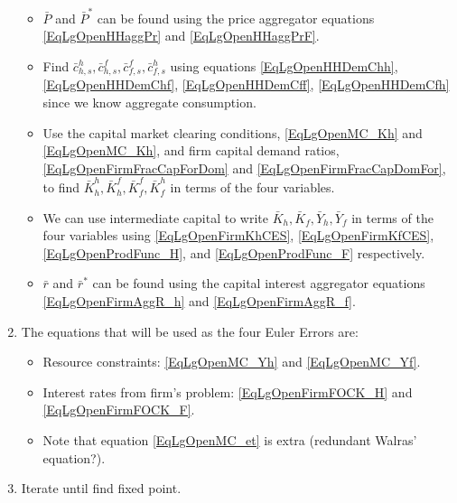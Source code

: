 \documentclass[letterpaper,12pt]{article}
\theoremstyle{definition}
\begin{document}
\begin{enumerate}
\begin{itemize}
        \item $\bar{P}$ and $\bar{P}^*$ can be found using the price aggregator equations \eqref{EqLgOpenHHaggPr} and \eqref{EqLgOpenHHaggPrF}.
        \item Find $\bar{c}_{h,s}^h, \bar{c}_{h,s}^f, \bar{c}_{f,s}^f, \bar{c}_{f,s}^h$ using equations \eqref{EqLgOpenHHDemChh}, \eqref{EqLgOpenHHDemChf}, \eqref{EqLgOpenHHDemCff}, \eqref{EqLgOpenHHDemCfh} since we know aggregate consumption.
        \item Use the capital market clearing conditions, \eqref{EqLgOpenMC_Kh} and \eqref{EqLgOpenMC_Kh}, and firm capital demand ratios,  \eqref{EqLgOpenFirmFracCapForDom} and \eqref{EqLgOpenFirmFracCapDomFor}, to find $\bar{K}_h^h, \bar{K}_h^f, \bar{K}_f^f, \bar{K}_f^h$ in terms of the four variables.
        \item We can use intermediate capital to write $\bar{K}_h, \bar{K}_f, \bar{Y}_h, \bar{Y}_f$ in terms of the four variables using \eqref{EqLgOpenFirmKhCES}, \eqref{EqLgOpenFirmKfCES}, \eqref{EqLgOpenProdFunc_H}, and \eqref{EqLgOpenProdFunc_F} respectively.
        \item $\bar{r}$ and $\bar{r}^*$ can be found using the capital interest aggregator equations \eqref{EqLgOpenFirmAggR_h} and \eqref{EqLgOpenFirmAggR_f}.
      \end{itemize}
      \item The equations that will be used as the four Euler Errors are:
      \begin{itemize}
        \item Resource constraints: \eqref{EqLgOpenMC_Yh} and \eqref{EqLgOpenMC_Yf}.
        \item Interest rates from firm's problem: \eqref{EqLgOpenFirmFOCK_H} and \eqref{EqLgOpenFirmFOCK_F}.
        \item Note that equation \eqref{EqLgOpenMC_et} is extra (redundant Walras' equation?).
      \end{itemize}
      \item Iterate until find fixed point.
    \end{enumerate}
\end{document}
